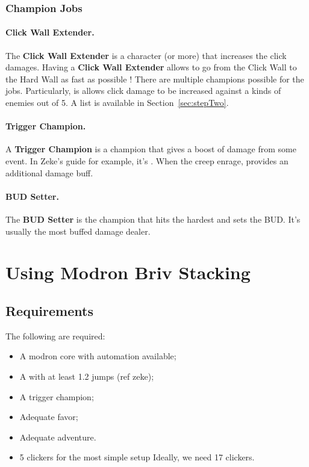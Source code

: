 \documentclass{article}
\begin{document}
\subsubsection{Champion Jobs}

\paragraph{Click Wall Extender.}
\label{sec:clickWallExtender}

The \textbf{Click Wall Extender} is a character (or more) that increases the click damages.
Having a \textbf{Click Wall Extender} allows to go from the Click Wall to the Hard Wall as fast as possible !
There are multiple champions possible for the jobs.
Particularly, \minsc is allows click damage to be increased against a kinds of enemies out of 5.
A list is available in Section~\ref{sec:stepTwo}.

\paragraph{Trigger Champion.}

A \textbf{Trigger Champion} is a champion that gives a boost of damage from some event.
In Zeke's guide for example, it's \dragonbait.
When the creep enrage, \dragonbait provides an additional damage buff.

\paragraph{BUD Setter.}

The \textbf{BUD Setter} is the champion that hits the hardest and sets the BUD.
It's usually the most buffed damage dealer.


\section{Using Modron Briv Stacking}

\subsection{Requirements}

The following are required:
\begin{itemize}
    \item A modron core with automation available;
    \item A \briv with at least 1.2 jumps (ref zeke);
    \item A trigger champion;
    \item Adequate favor;
    \item Adequate adventure.
    \item 5 clickers for the most simple setup Ideally, we need 17 clickers.
\end{itemize}
\end{document}
